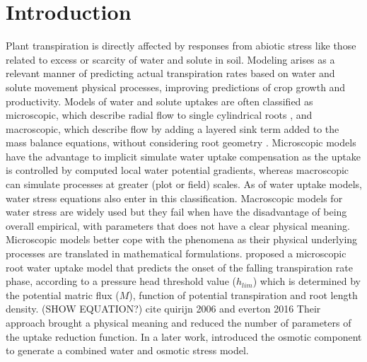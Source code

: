 \section*{Introduction}


Plant transpiration is directly affected by responses from abiotic stress like those related to excess or scarcity of water and solute in soil.
Modeling arises as a relevant manner of predicting actual transpiration rates based on water and solute movement physical processes, improving predictions of crop growth and productivity.
Models of water and solute uptakes are often classified as microscopic, which describe radial flow to single cylindrical roots \citep{gardner,barber74,cushman,willigen1,roose,liersolute}, and macroscopic, which describe flow by adding a layered sink term added to the mass balance equations, without considering root geometry \citep{simunekHYDRUS,somma,vandam}.
Microscopic models have the advantage to implicit simulate water uptake compensation as the uptake is controlled by computed local water potential gradients, whereas macroscopic can simulate processes at greater (plot or field) scales.
As of water uptake models, water stress equations also enter in this classification.
Macroscopic models for water stress \citep{feddes78,homaee,li} are widely used but they fail when 
have the disadvantage of being overall empirical, with parameters that does not have a clear physical meaning. 
Microscopic models 
better cope with the phenomena as their physical underlying processes are translated in mathematical formulations. 
\cite{lierwater} proposed a microscopic root water uptake model that predicts the onset of the falling transpiration rate phase, according to a pressure head threshold value ($h_{lim}$) which is determined by the potential matric flux ($M$), function of potential transpiration and root length density. (SHOW EQUATION?) cite quirijn 2006 and everton 2016
Their approach brought a physical meaning and reduced the number of parameters of the uptake reduction function. 
In a later work, \cite{liersolute} introduced the osmotic component to generate a combined water and osmotic stress model.

